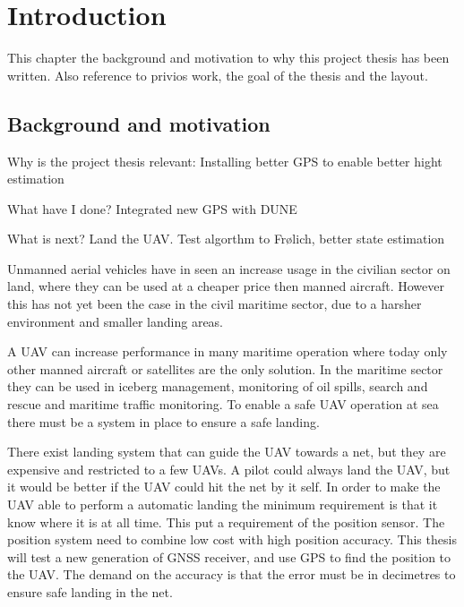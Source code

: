 
\chapter{Introduction}
This chapter the background and motivation to why this project thesis has been written. Also reference to privios work, the goal of the thesis and the layout.
\section{Background and motivation}
Why is the project thesis relevant: Installing better GPS to enable better hight estimation

What have I done? Integrated new GPS with DUNE

What is next? Land the UAV. Test algorthm to Frølich, better state estimation 

Unmanned aerial vehicles have in seen an increase usage in the civilian sector on land, where they can be used at a cheaper price then manned aircraft. However this has not yet been the case in the civil maritime sector, due to a harsher environment and smaller landing areas.

A UAV can increase performance in many maritime operation where today only other manned aircraft or satellites are the only solution. In the maritime sector they can be used in iceberg management, monitoring of oil spills, search and rescue and maritime traffic monitoring. To enable a safe UAV operation at sea there must be a system in place to ensure a safe landing.

There exist landing system that can guide the UAV towards a net, but they are expensive and restricted to a few UAVs. A pilot could always land the UAV, but it would be better if the UAV could hit the net by it self. In order to make the UAV able to perform a automatic landing the minimum requirement is that it know where it is at all time. This put a requirement of the position sensor. The position system need to combine low cost with high position accuracy. This thesis will test a new generation of GNSS receiver, and use GPS to find the position to the UAV. The demand on the accuracy is that the error must be in decimetres to ensure safe landing in the net.

